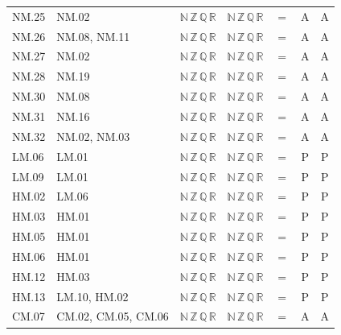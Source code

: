 {\begin{longtable}{l l l l c c c}
NM.25 & NM.02 & $\mathbb N\,\mathbb Z\,\mathbb Q\,\mathbb R$ & $\mathbb N\,\mathbb Z\,\mathbb Q\,\mathbb R$ & $=$ & A & A \\
NM.26 & NM.08, NM.11 & $\mathbb N\,\mathbb Z\,\mathbb Q\,\mathbb R$ & $\mathbb N\,\mathbb Z\,\mathbb Q\,\mathbb R$ & $=$ & A & A \\
NM.27 & NM.02 & $\mathbb N\,\mathbb Z\,\mathbb Q\,\mathbb R$ & $\mathbb N\,\mathbb Z\,\mathbb Q\,\mathbb R$ & $=$ & A & A \\
NM.28 & NM.19 & $\mathbb N\,\mathbb Z\,\mathbb Q\,\mathbb R$ & $\mathbb N\,\mathbb Z\,\mathbb Q\,\mathbb R$ & $=$ & A & A \\
NM.30 & NM.08 & $\mathbb N\,\mathbb Z\,\mathbb Q\,\mathbb R$ & $\mathbb N\,\mathbb Z\,\mathbb Q\,\mathbb R$ & $=$ & A & A \\
NM.31 & NM.16 & $\mathbb N\,\mathbb Z\,\mathbb Q\,\mathbb R$ & $\mathbb N\,\mathbb Z\,\mathbb Q\,\mathbb R$ & $=$ & A & A \\
NM.32 & NM.02, NM.03 & $\mathbb N\,\mathbb Z\,\mathbb Q\,\mathbb R$ & $\mathbb N\,\mathbb Z\,\mathbb Q\,\mathbb R$ & $=$ & A & A \\
LM.06 & LM.01 & $\mathbb N\,\mathbb Z\,\mathbb Q\,\mathbb R$ & $\mathbb N\,\mathbb Z\,\mathbb Q\,\mathbb R$ & $=$ & P & P \\
LM.09 & LM.01 & $\mathbb N\,\mathbb Z\,\mathbb Q\,\mathbb R$ & $\mathbb N\,\mathbb Z\,\mathbb Q\,\mathbb R$ & $=$ & P & P \\
HM.02 & LM.06 & $\mathbb N\,\mathbb Z\,\mathbb Q\,\mathbb R$ & $\mathbb N\,\mathbb Z\,\mathbb Q\,\mathbb R$ & $=$ & P & P \\
HM.03 & HM.01 & $\mathbb N\,\mathbb Z\,\mathbb Q\,\mathbb R$ & $\mathbb N\,\mathbb Z\,\mathbb Q\,\mathbb R$ & $=$ & P & P \\
HM.05 & HM.01 & $\mathbb N\,\mathbb Z\,\mathbb Q\,\mathbb R$ & $\mathbb N\,\mathbb Z\,\mathbb Q\,\mathbb R$ & $=$ & P & P \\
HM.06 & HM.01 & $\mathbb N\,\mathbb Z\,\mathbb Q\,\mathbb R$ & $\mathbb N\,\mathbb Z\,\mathbb Q\,\mathbb R$ & $=$ & P & P \\
HM.12 & HM.03 & $\mathbb N\,\mathbb Z\,\mathbb Q\,\mathbb R$ & $\mathbb N\,\mathbb Z\,\mathbb Q\,\mathbb R$ & $=$ & P & P \\
HM.13 & LM.10, HM.02 & $\mathbb N\,\mathbb Z\,\mathbb Q\,\mathbb R$ & $\mathbb N\,\mathbb Z\,\mathbb Q\,\mathbb R$ & $=$ & P & P \\
CM.07 & CM.02, CM.05, CM.06 & $\mathbb N\,\mathbb Z\,\mathbb Q\,\mathbb R$ & $\mathbb N\,\mathbb Z\,\mathbb Q\,\mathbb R$ & $=$ & A & A \\

\end{longtable}}
